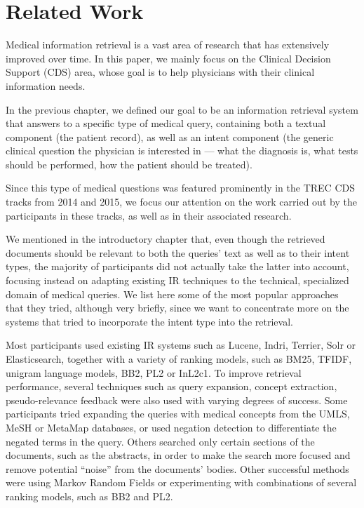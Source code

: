 \chapter{Related Work} \label{related}

Medical information retrieval is a vast area of research that has  extensively improved over time. 
In this paper, we mainly focus on the Clinical Decision Support (CDS) area, whose goal is to help
physicians with their clinical information needs.

In the previous chapter, we defined our goal to be
an information retrieval system that answers to a specific type of medical query,
containing both a textual component (the patient record), as well as an intent component
(the generic clinical question the physician is interested in 
--- what the diagnosis is, what tests should be performed, how the patient should be treated).

Since this type of medical questions was featured prominently in the TREC CDS tracks from 2014 and 2015,
we focus our attention on the work carried out by the participants in these tracks, as well as in
 their associated research.
 
We mentioned in the introductory chapter that, even though the retrieved documents should be
relevant to both the queries' text as well as to their intent types, the majority of participants
did not actually take the latter into account, focusing instead on adapting existing
IR techniques to the technical, specialized domain of medical queries. We list here some of the most
popular approaches that they tried, although very briefly, since we want to concentrate more on the systems that
tried to incorporate the intent type into the retrieval.

Most participants used existing IR systems such as Lucene, Indri, Terrier, Solr or Elasticsearch,
together with a variety of ranking models, such as BM25, TFIDF, unigram language models, BB2, PL2
or InL2c1.
To improve retrieval performance, several techniques such as query expansion, concept extraction, pseudo-relevance feedback 
were also used with varying degrees of success. 
Some participants tried expanding the queries with medical concepts
from the UMLS, MeSH or MetaMap databases, or used negation detection to differentiate the negated terms in the query.
Others searched only certain sections of the documents, such as the abstracts, in order to make the search more focused
and remove potential ``noise'' from the documents' bodies.
Other successful methods were using Markov Random Fields or experimenting with combinations of several ranking models,
such as BB2 and PL2.

